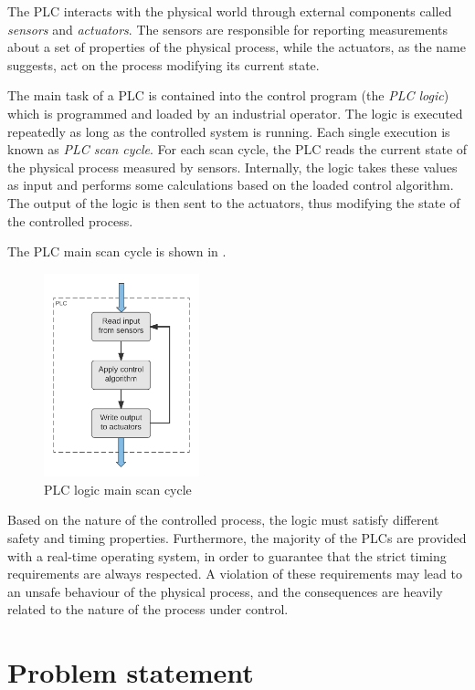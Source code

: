 The PLC interacts with the physical world through external components called \emph{sensors} and \emph{actuators}.
The sensors are responsible for reporting measurements about a set of properties of the physical process,
while the actuators, as the name suggests, act on the process modifying its current state.

The main task of a PLC is contained into the control program (the \emph{PLC logic}) which is programmed and loaded by an industrial operator.
The logic is executed repeatedly as long as the controlled system is running. Each single execution is known as \emph{PLC scan cycle}.
For each scan cycle, the PLC reads the current state of the physical process measured by sensors.
Internally, the logic takes these values as input and performs some calculations based on the loaded control algorithm.
The output of the logic is then sent to the actuators, thus modifying the state of the controlled process.

The PLC main scan cycle is shown in .
\begin{figure}[h]
\centerline{\includegraphics[width=0.4\textwidth]{res/scan-cycle}}
\caption{PLC logic main scan cycle\label{fig:scan-cycle}}
\end{figure}

Based on the nature of the controlled process, the logic must satisfy different safety and timing properties.
Furthermore, the majority of the PLCs are provided with a real-time operating system, in order to guarantee that the strict timing requirements are always respected.
A violation of these requirements may lead to an unsafe behaviour of the physical process, and the consequences are heavily related to the nature of the process under control.


\section{Problem statement}

